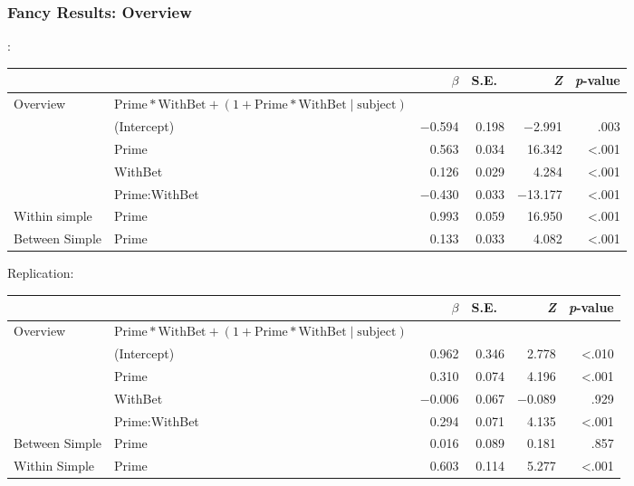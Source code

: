 \documentclass[noamssymb]{beamer}
\begin{document}
\begin{frame}

  \frametitle{{\ftf Fancy Results: Overview}}

  \citeauthor{Bott:2016aa}:
    \begin{adjustbox}{width=1\textwidth,center=\textwidth}
    \begin{tabular}{llrrrr}
      \hline
      & & \(\beta\) & S.E.\ & \emph{Z} & \emph{p}-value  \\
      \hline
      Overview & \(\text{Prime} * \text{WithBet} + (1 + \text{Prime} * \text{WithBet} \mid \text{subject})\) & & & \\
      & (Intercept) & \(-\)0.594 & 0.198 & \(-\)2.991 & .003 \\
      & Prime & 0.563 & 0.034 & 16.342 & <.001 \\
      & WithBet & 0.126 & 0.029 & 4.284 & <.001 \\
      & Prime:WithBet & \(-\)0.430 & 0.033 & \(-\)13.177 & <.001 \\
      Within simple & Prime & 0.993 & 0.059 & 16.950 & <.001 \\
      Between Simple & Prime & 0.133 & 0.033 & 4.082 & <.001 \\
      \hline
    \end{tabular}
  \end{adjustbox}

Replication:
\begin{adjustbox}{width=1\textwidth,center=\textwidth}
    \begin{tabular}{llrrrr}
      \hline
      & & \(\beta\) & S.E.\ & \emph{Z} & \emph{p}-value  \\
      \hline
      Overview & \(\text{Prime} * \text{WithBet} + (1 + \text{Prime} * \text{WithBet} \mid \text{subject})\) & & & \\
      & (Intercept)   & 0.962  & 0.346 &  2.778 & <.010 \\
      & Prime         & 0.310  & 0.074 &  4.196 & <.001 \\
      & WithBet       & \(-\)0.006 & 0.067 & \(-\)0.089 &  .929 \\
      & Prime:WithBet & 0.294  & 0.071 &  4.135 & <.001 \\
      Between Simple & Prime & 0.016 & 0.089 & 0.181 & .857  \\
      Within Simple  & Prime & 0.603 & 0.114 & 5.277 & <.001 \\
      \hline
    \end{tabular}
  \end{adjustbox}

\end{frame}
\end{document}
